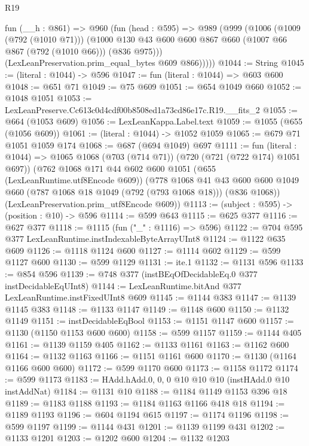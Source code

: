 \begin{lexlean}{R19}
\begin{coremodule}
      fun (__h : @861) =>
      @960
        (fun (head : @595) =>
        @989
          (@999
            (@1006
              (@1009 (@792 (@1010 @71)))
              (@1000 @130 @43 @600 @600 @867 @660 (@1007 @66 @867 (@792 (@1010 @66))) (@836 @975)))
            (LexLeanPreservation.prim_equal_bytes @609 @866)))))
@1044 := String
@1045 := (literal : @1044) -> @596
@1047 := fun (literal : @1044) => @603 @600
@1048 := @651 @71
@1049 := @75 @609
@1051 := @654 @1049 @660
@1052 := @1048 @1051
@1053 := LexLeanPreserve.Cc613c0d4cdf00b8508ed1a73cd86e17c.R19.__fits_2
@1055 := @664 (@1053 @609)
@1056 := LexLeanKappa.Label.text
@1059 := @1055 (@655 (@1056 @609))
@1061 := (literal : @1044) -> @1052 @1059
@1065 := @679 @71 @1051 @1059 @174
@1068 := @687 (@694 @1049) @697
@1111 := fun (literal : @1044) =>
  @1065
    @1068
    (@703 (@714 @71))
    (@720 (@721 (@722 @174) @1051 @697))
    (@762
      @1068
      @171
      @44
      @602
      @600
      @1051
      (@655 (LexLeanRuntime.utf8Encode @609))
      (@778
        @1068
        @41
        @43
        @600
        @600
        @1049
        @660
        (@787 @1068 @18 @1049 (@792 (@793 @1068 @18)))
        (@836 @1068))
      (LexLeanPreservation.prim_utf8Encode @609))
@1113 := (subject : @595) -> (position : @10) -> @596
@1114 := @599 @643
@1115 := @625 @377
@1116 := @627 @377
@1118 := @1115 (fun ("_" : @1116) => @596)
@1122 := @704 @595 @377 LexLeanRuntime.instIndexableByteArrayUInt8
@1124 := @1122 @635 @609
@1126 := @1118 @1124 @600
@1127 := @1114 @602
@1129 := @599 @1127 @600
@1130 := @599 @1129
@1131 := ite.{1}
@1132 := @1131 @596
@1133 := @854 @596
@1139 := @748 @377 (instBEqOfDecidableEq.{0} @377 instDecidableEqUInt8)
@1144 := LexLeanRuntime.bitAnd @377 LexLeanRuntime.instFixedUInt8 @609
@1145 := @1144 @383
@1147 := @1139 @1145 @383
@1148 := @1133 @1147
@1149 := @1148 @600
@1150 := @1132 @1149
@1151 := instDecidableEqBool
@1153 := @1151 @1147 @600
@1157 := @1130 (@1150 @1153 @600 @600)
@1158 := @599 @1157
@1159 := @1144 @405
@1161 := @1139 @1159 @405
@1162 := @1133 @1161
@1163 := @1162 @600
@1164 := @1132 @1163
@1166 := @1151 @1161 @600
@1170 := @1130 (@1164 @1166 @600 @600)
@1172 := @599 @1170 @600
@1173 := @1158 @1172
@1174 := @599 @1173
@1183 := HAdd.hAdd.{0, 0, 0} @10 @10 @10 (instHAdd.{0} @10 instAddNat)
@1184 := @1131 @10
@1188 := @1184 @1149 @1153 @396 @18
@1189 := @1183 @1188
@1193 := @1184 @1163 @1166 @418 @18
@1194 := @1189 @1193
@1196 := @604 @1194 @615
@1197 := @1174 @1196
@1198 := @599 @1197
@1199 := @1144 @431
@1201 := @1139 @1199 @431
@1202 := @1133 @1201
@1203 := @1202 @600
@1204 := @1132 @1203

\end{coremodule}
\end{lexlean}
